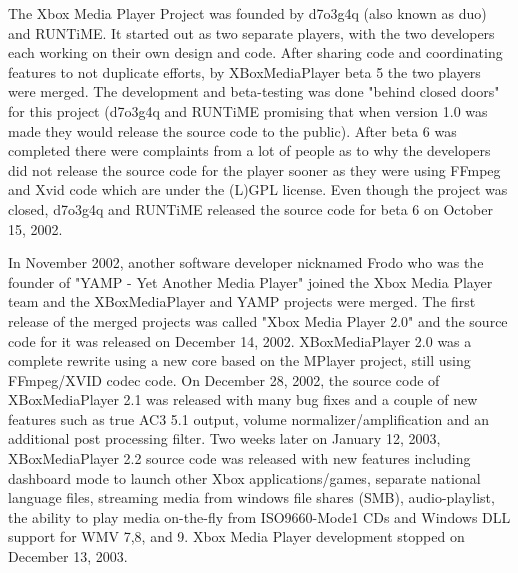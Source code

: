 \documentclass[12pt]{report}
\begin{document}
\vspace{\baselineskip}
The Xbox Media Player Project was founded by d7o3g4q (also known as duo) and RUNTiME. It started out as two separate players, with the two developers each working on their own design and code. After sharing code and coordinating features to not duplicate efforts, by XBoxMediaPlayer beta 5 the two players were merged. The development and beta-testing was done "behind closed doors" for this project (d7o3g4q and RUNTiME promising that when version 1.0 was made they would release the source code to the public). After beta 6 was completed there were complaints from a lot of people as to why the developers did not release the source code for the player sooner as they were using FFmpeg and Xvid code which are under the (L)GPL license. Even though the project was closed, d7o3g4q and RUNTiME released the source code for beta 6 on October 15, 2002.\par


\vspace{\baselineskip}
In November 2002, another software developer nicknamed Frodo who was the founder of "YAMP - Yet Another Media Player" joined the Xbox Media Player team and the XBoxMediaPlayer and YAMP projects were merged. The first release of the merged projects was called "Xbox Media Player 2.0" and the source code for it was released on December 14, 2002. XBoxMediaPlayer 2.0 was a complete rewrite using a new core based on the MPlayer project, still using FFmpeg/XVID codec code. On December 28, 2002, the source code of XBoxMediaPlayer 2.1 was released with many bug fixes and a couple of new features such as true AC3 5.1 output, volume normalizer/amplification and an additional post processing filter. Two weeks later on January 12, 2003, XBoxMediaPlayer 2.2 source code was released with new features including dashboard mode to launch other Xbox applications/games, separate national language files, streaming media from windows file shares (SMB), audio-playlist, the ability to play media on-the-fly from ISO9660-Mode1 CDs and Windows DLL support for WMV 7,8, and 9. Xbox Media Player development stopped on December 13, 2003.\par


\vspace{\baselineskip}
\end{document}
